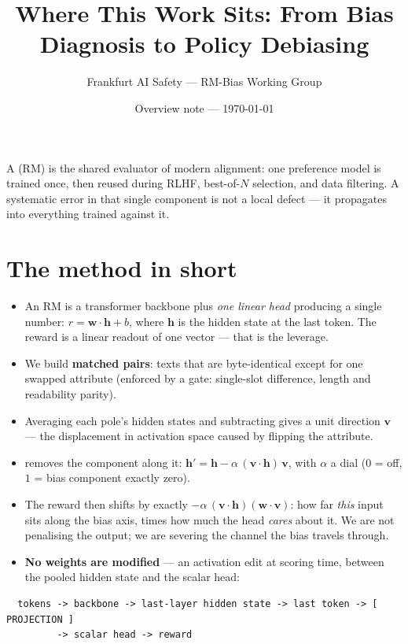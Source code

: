 \documentclass{article}
\title{Where This Work Sits: From Bias Diagnosis to Policy Debiasing}
\author{Frankfurt AI Safety --- RM-Bias Working Group}
\date{Overview note --- \today}
\begin{document}
\maketitle
\sloppy

\noindent A \rewardmodel{} (RM) is the shared evaluator of modern alignment: one preference model is trained
once, then reused during RLHF, best-of-$N$ selection, and data filtering. A systematic error in that single
component is not a local defect --- it propagates into everything trained against it.

\section*{The method in short}
\begin{itemize}\itemsep2pt
  \item An RM is a transformer backbone plus \emph{one linear head} producing a single number:
        $r = \mathbf{w}\cdot\mathbf{h} + b$, where $\mathbf{h}$ is the hidden state at the last token.
        The reward is a linear readout of one vector --- that is the leverage.
  \item We build \textbf{matched pairs}: texts that are byte-identical except for one swapped attribute
        (enforced by a gate: single-slot difference, length and readability parity).
  \item Averaging each pole's hidden states and subtracting gives a unit \diffmean{} direction $\mathbf{v}$
        --- the displacement in activation space caused by flipping the attribute.
  \item \textbf{\nullspace{}} removes the component along it:
        $\mathbf{h}' = \mathbf{h} - \alpha\,(\mathbf{v}\cdot\mathbf{h})\,\mathbf{v}$, with $\alpha$ a dial
        ($0$ = off, $1$ = bias component exactly zero).
  \item The reward then shifts by exactly $-\alpha\,(\mathbf{v}\cdot\mathbf{h})(\mathbf{w}\cdot\mathbf{v})$:
        how far \emph{this} input sits along the bias axis, times how much the head \emph{cares} about it.
        We are not penalising the output; we are severing the channel the bias travels through.
  \item \textbf{No weights are modified} --- an activation edit at scoring time, between the pooled hidden
        state and the scalar head:
\end{itemize}
\begin{verbatim}
  tokens -> backbone -> last-layer hidden state -> last token -> [ PROJECTION ]
         -> scalar head -> reward
\end{verbatim}
\end{document}
